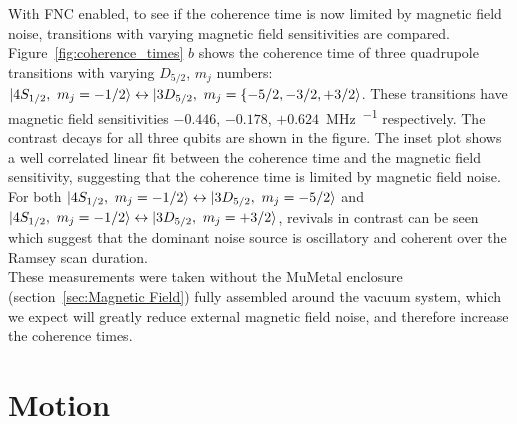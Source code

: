     With FNC enabled, to see if the coherence time is now limited by magnetic field noise, transitions with varying magnetic field sensitivities are compared. Figure~\ref{fig:coherence_times} $b$ shows the coherence time of three quadrupole transitions with varying $D_{5/2}$, $m_j$ numbers: $\ket{4S_{1/2},~m_j=-1/2} \leftrightarrow \ket{3D_{5/2},~m_j=\lbrace -5/2, -3/2, +3/2}$. These transitions have magnetic field sensitivities $-0.446$, $-0.178$, $+0.624$~\unit{\MHz\per\gauss} respectively. The contrast decays for all three qubits are shown in the figure. The inset plot shows a well correlated linear fit between the coherence time and the magnetic field sensitivity, suggesting that the coherence time is limited by magnetic field noise. For both $\ket{4S_{1/2},~m_j=-1/2} \leftrightarrow \ket{3D_{5/2},~m_j=-5/2}$ and $\ket{4S_{1/2},~m_j=-1/2} \leftrightarrow \ket{3D_{5/2},~m_j=+3/2}$, revivals in contrast can be seen which suggest that the dominant noise source is oscillatory and coherent over the Ramsey scan duration.\\
    These measurements were taken without the MuMetal enclosure (section~\ref{sec:Magnetic Field}) fully assembled around the vacuum system, which we expect will greatly reduce external magnetic field noise, and therefore increase the coherence times.


\section{Motion}
\label{sec:Motion}

